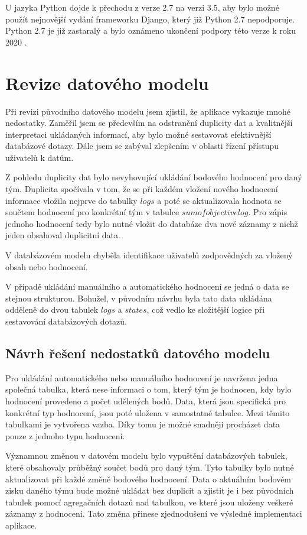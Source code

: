 \documentclass[
  digital,
  twoside,
  table, 
  nolof, 
  nolot
]{fithesis3}
\begin{document}
U jazyka Python dojde k přechodu z verze 2.7 na verzi 3.5, aby bylo možné použít nejnovější vydání frameworku Django, který již Python 2.7 nepodporuje. Python 2.7 je již zastaralý a bylo oznámeno ukončení podpory této verze k roku 2020 \cite{python27}.


\section{Revize datového modelu}

Při revizi původního datového modelu jsem zjistil, že aplikace vykazuje mnohé nedostatky. Zaměřil jsem se především na odstranění duplicity dat a kvalitnější interpretaci ukládaných informací, aby bylo možné sestavovat efektivnější databázové dotazy. Dále jsem se zabýval zlepšením v oblasti řízení přístupu uživatelů k datům.

Z pohledu duplicity dat bylo nevyhovující ukládání bodového hodnocení pro daný tým. Duplicita spočívala v tom, že se při každém vložení nového hodnocení informace vložila nejprve do tabulky $logs$ a poté se aktualizovala hodnota se součtem hodnocení pro konkrétní tým v tabulce $sumofobjectivelog$. Pro zápis jednoho hodnocení tedy bylo nutné vložit do databáze dva nové záznamy z nichž jeden obsahoval duplicitní data.

V databázovém modelu chyběla identifikace uživatelů zodpovědných za vložený obsah nebo hodnocení. 

V případě ukládání manuálního a automatického hodnocení se jedná o data se stejnou strukturou. Bohužel, v původním návrhu byla tato data ukládána odděleně do dvou tabulek $logs$ a $states$, což vedlo ke složitější logice při sestavování databázových dotazů.

\subsection{Návrh řešení nedostatků datového modelu}
Pro ukládání automatického nebo manuálního hodnocení je navržena jedna společná tabulka, která nese informaci o tom, který tým je hodnocen, kdy bylo hodnocení provedeno a počet udělených bodů. Data, která jsou specifická pro konkrétní typ hodnocení, jsou poté uložena v samostatné tabulce. Mezi těmito tabulkami je vytvořena vazba. Díky tomu je možné snadněji procházet data pouze z jednoho typu hodnocení.

Významnou změnou v datovém modelu bylo vypuštění databázových tabulek, které obsahovaly průběžný součet bodů pro daný tým. Tyto tabulky bylo nutné aktualizovat při každé změně bodového hodnocení. Data o aktuálním bodovém zisku daného týmu bude možné ukládat bez duplicit a zjistit je i bez původních tabulek pomocí agregačních dotazů nad tabulkou, ve které jsou uloženy veškeré záznamy z hodnocení. Tato změna přinese zjednodušení ve výsledné implementaci aplikace.
\end{document}
